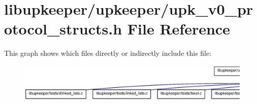 \section{libupkeeper/upkeeper/upk\_\-v0\_\-protocol\_\-structs.h File Reference}
\label{upk__v0__protocol__structs_8h}
This graph shows which files directly or indirectly include this file:\nopagebreak
\begin{figure}[H]
\begin{center}
\leavevmode
\includegraphics[width=400pt]{upk__v0__protocol__structs_8h__dep__incl}
\end{center}
\end{figure}
